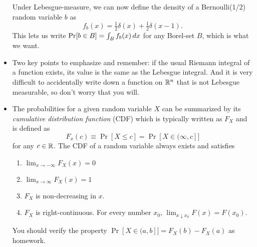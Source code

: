 \begin{itemize}
  Under Lebesgue-measure, we can now define the density of a
  Bernoulli(1/2) random variable $b$ as
  \begin{equation*}
    f_b(x) = \tfrac{1}{2} \delta(x) + \tfrac{1}{2} \delta(x - 1).
  \end{equation*}
  This lets us write $\operatorname{Pr}[b \in B] = \int_B f_b(x) \,dx$ for any Borel-set
  $B$, which is what we want.

\item Two key points to emphasize and remember: if the usual Riemann
  integral of a function exists, its value is the same as the Lebesgue
  integral. And it is very difficult to accidentally write down a
  function on $\mathbb{R}^n$ that is not Lebesgue measurable, so don't worry
  that you will.

\item The probabilities for a given random variable $X$ can be
  summarized by its \emph{cumulative distribution function} (CDF)
  which is typically written as $F_X$ and is defined as
  \begin{equation*}
    F_x(c) \equiv \Pr[X \leq c] = \Pr[X \in (\infty, c]]
  \end{equation*}
  for any $c \in \mathbb{R}$.  The CDF of a random variable always exists and
  satisfies
  \begin{enumerate}
  \item $\lim_{x \to -\infty} F_X(x) = 0$
  \item $\lim_{x \to \infty} F_X(x) = 1$
  \item $F_X$ is non-decreasing in $x$.
  \item $F_X$ is right-continuous.  For every number $x_0$,
    $\lim_{x \downarrow x_0} F(x) = F(x_0)$.
  \end{enumerate}

  You should verify the property $\Pr[X \in (a, b]] = F_X(b) - F_X(a)$
  as homework.


\end{itemize}

